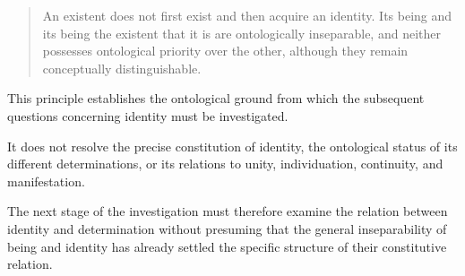 \begin{quote}
An existent does not first exist and
then acquire an identity. Its being
and its being the existent that it is
are ontologically inseparable, and
neither possesses ontological priority
over the other, although they remain
conceptually distinguishable.
\end{quote}

This principle establishes the
ontological ground from which the
subsequent questions concerning
identity must be investigated.

It does not resolve the precise
constitution of identity, the
ontological status of its different
determinations, or its relations
to unity, individuation, continuity,
and manifestation.

The next stage of the investigation
must therefore examine the relation
between identity and determination
without presuming that the general
inseparability of being and identity
has already settled the specific
structure of their constitutive relation.


